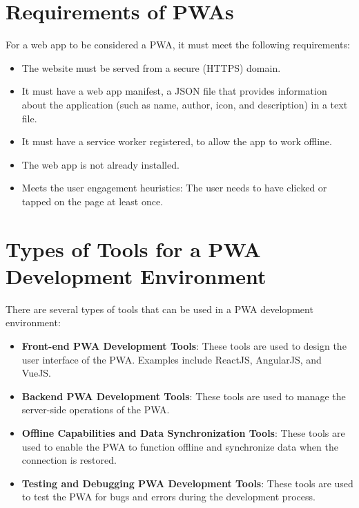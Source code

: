 \documentclass{article}
\begin{document}
\begin{multicols}{2}
	\section{Requirements of PWAs}
	For a web app to be considered a PWA, it must meet the following requirements:
	\begin{itemize}
		\item The website must be served from a secure (HTTPS) domain.
		\item It must have a web app manifest, a JSON file that provides information about the application (such as name, author, icon, and description) in a text file.
		\item It must have a service worker registered, to allow the app to work offline.
		\item The web app is not already installed.
		\item Meets the user engagement heuristics: The user needs to have clicked or tapped on the page at least once.
	\end{itemize}
	
	\section{Types of Tools for a PWA Development Environment}
	There are several types of tools that can be used in a PWA development environment:
	\begin{itemize}
		\item \textbf{Front-end PWA Development Tools}: These tools are used to design the user interface of the PWA. Examples include ReactJS, AngularJS, and VueJS.
		\item \textbf{Backend PWA Development Tools}: These tools are used to manage the server-side operations of the PWA.
		\item \textbf{Offline Capabilities and Data Synchronization Tools}: These tools are used to enable the PWA to function offline and synchronize data when the connection is restored.
		\item \textbf{Testing and Debugging PWA Development Tools}: These tools are used to test the PWA for bugs and errors during the development process.
	\end{itemize}

\end{multicols}
\end{document}
